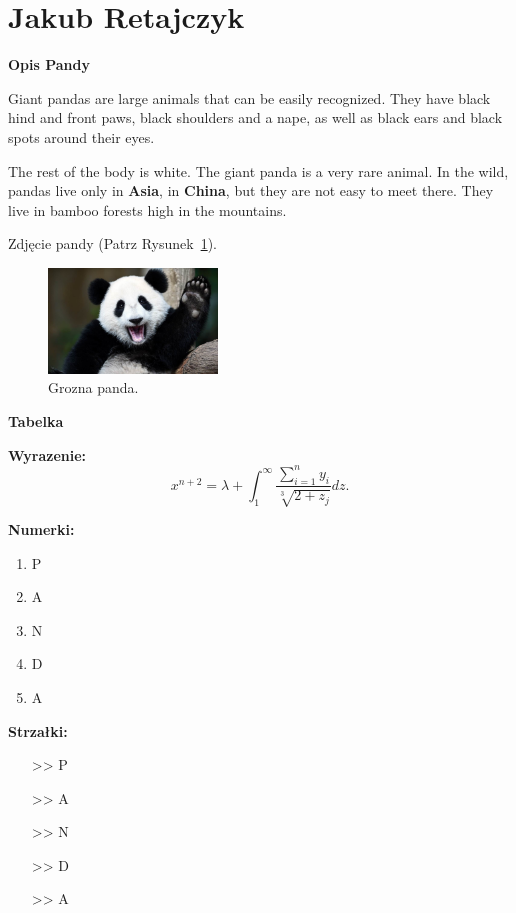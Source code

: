 \section{Jakub Retajczyk}
\label{sec:jretaj}


\bigskip
\textbf{Opis Pandy}
\bigskip

Giant pandas are large animals that can be easily recognized. They have black hind and front paws, black shoulders and a nape, as well as black ears and black spots around their eyes. 

The rest of the body is white.
The giant panda is a very rare animal. In the wild, pandas live only in \textbf{Asia}, in \textbf{China}, but they are not easy to meet there. They live in bamboo forests high in the mountains.

\bigskip
Zdjęcie pandy (Patrz Rysunek~\ref{fig:ppanda}).

\begin{figure}[htbp] 
    \centering
    \includegraphics[width=0.4\textwidth]{pictures/ppanda.jpg} 
    \caption{Grozna panda.}
    \label{fig:ppanda}
\end{figure}

\bigskip

\textbf{Tabelka}




\bigskip
\textbf{Wyrazenie:} 
\begin{equation}
    x^{n + 2} = \lambda + \int_{1}^{\infty} \frac{\sum_{i=1}^{n} y_{i}}{\sqrt[3]{2 + z_{j}}} dz.
\end{equation}
\bigskip

\newpage
\textbf{Numerki:}

\begin{enumerate}
    \item P
    \item A
    \item N
    \item D
    \item A
\end{enumerate}

\bigskip


\textbf{Strzałki:}

\begin{itemize}
    \item[>>] P
    \item[>>] A
    \item[>>] N
    \item[>>] D
    \item[>>] A
\end{itemize}